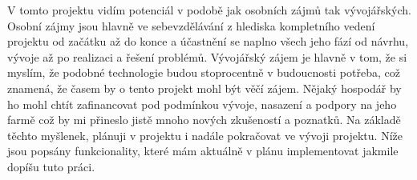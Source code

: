 V tomto projektu vidím potenciál v podobě jak osobních zájmů tak vývojářských.
Osobní zájmy jsou hlavně ve sebevzdělávání z hlediska kompletního vedení projektu od začátku až do konce a účastnění se naplno všech jeho fází od návrhu, vývoje až po realizaci a řešení problémů.
Vývojářský zájem je hlavně v tom, že si myslím, že podobné technologie budou stoprocentně v budoucnosti potřeba, což znamená, že časem by o tento projekt mohl být věčí zájem.
Nějaký hospodář by ho mohl chtít zafinancovat pod podmínkou vývoje, nasazení a podpory na jeho farmě což by mi přineslo jistě mnoho nových zkušeností a poznatků. \newline
Na základě těchto myšlenek, plánuji v projektu i nadále pokračovat ve vývoji projektu.
Níže jsou popsány funkcionality, které mám aktuálně v plánu implementovat jakmile dopíšu tuto práci.
\newline


